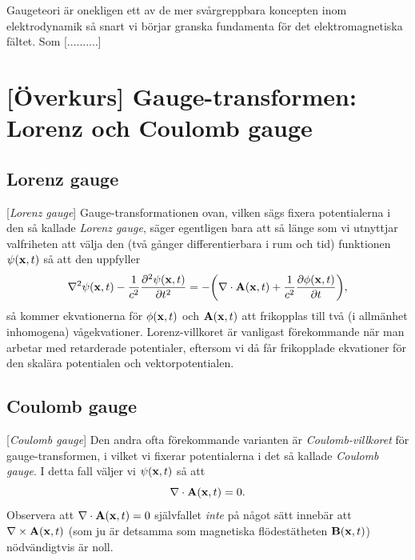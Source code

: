 {{{{{{Gaugeteori {\"a}r onekligen ett av de mer sv{\aa}rgreppbara koncepten inom
elektrodynamik s{\aa} snart vi b{\"o}rjar granska fundamenta f{\"o}r det
elektromagnetiska f{\"a}ltet. Som [..........]




\section{[{\"O}verkurs] Gauge-transformen: Lorenz och Coulomb gauge}
\subsection{Lorenz gauge}
[{{\it Lorenz gauge}}]
Gauge-transformationen ovan, vilken s{\"a}gs fixera potentialerna i den s{\aa}
kallade {\it Lorenz gauge},
s{\"a}ger egentligen bara att s{\aa} l{\"a}nge som vi utnyttjar valfriheten att
v{\"a}lja den (tv{\aa} g{\aa}nger differentierbara i rum och tid) funktionen
$\psi({\bf x},t)$ s{\aa} att den uppfyller
$$
  \nabla^2\psi({\bf x},t)
    -{{1}\over{c^2}}{{\partial^2\psi({\bf x},t)}\over{\partial t^2}}
  =-\bigg(
      \nabla\cdot{\bf A}({\bf x},t)
        +{{1}\over{c^2}}{{\partial\phi({\bf x},t)}\over{\partial t}}
     \bigg),
$$
s{\aa} kommer ekvationerna f{\"o}r $\phi({\bf x},t)$ och ${\bf A}({\bf x},t)$
att frikopplas till tv{\aa} (i allm{\"a}nhet inhomogena) v{\aa}gekvationer.
Lorenz-villkoret {\"a}r vanligast f{\"o}rekommande n{\"a}r man arbetar med
retarderade potentialer, eftersom vi d{\aa} f{\aa}r frikopplade ekvationer
f{\"o}r den skal{\"a}ra potentialen och
vektorpotentialen.

\subsection{Coulomb gauge}
[{{\it Coulomb gauge}}]
Den andra ofta f{\"o}rekommande varianten {\"a}r {\it Coulomb-villkoret}
f{\"o}r gauge-transformen, i vilket vi fixerar potentialerna i det s{\aa}
kallade {\it Coulomb gauge}. I detta fall v{\"a}ljer vi $\psi({\bf x},t)$
s{\aa} att
$$
  \nabla\cdot{\bf A}({\bf x},t)=0.
$$
Observera att $\nabla\cdot{\bf A}({\bf x},t)=0$ sj{\"a}lvfallet {\it inte}
p{\aa} n{\aa}got s{\"a}tt inneb{\"a}r att $\nabla\times{\bf A}({\bf x},t)$
(som ju {\"a}r detsamma som magnetiska fl{\"o}dest{\"a}theten
${\bf B}({\bf x},t)$) n{\"o}dv{\"a}ndigtvis {\"a}r noll.

}}}}}}
